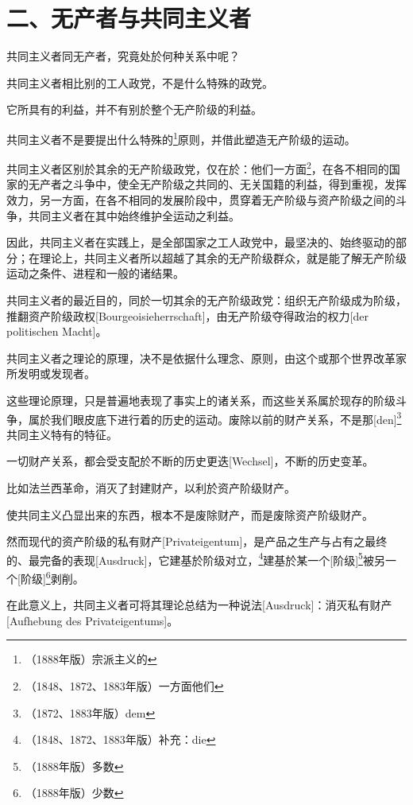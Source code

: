 \documentclass[a4paper,12pt]{ctexart}
\begin{document}

\section{二、无产者与共同主义者}

共同主义者同无产者，究竟处於何种关系中呢？

共同主义者相比别的工人政党，不是什么特殊的政党。

它所具有的利益，并不有别於整个无产阶级的利益。

共同主义者不是要提出什么特殊的\footnote{（1888年版）宗派主义的}原则，并借此塑造无产阶级的运动。

共同主义者区别於其余的无产阶级政党，仅在於：他们一方面\footnote{（1848、1872、1883年版）一方面他们}，在各不相同的国家的无产者之斗争中，使全无产阶级之共同的、无关国籍的利益，得到重视，发挥效力，另一方面，在各不相同的发展阶段中，贯穿着无产阶级与资产阶级之间的斗争，共同主义者在其中始终维护全运动之利益。

因此，共同主义者在实践上，是全部国家之工人政党中，最坚决的、始终驱动的部分；在理论上，共同主义者所以超越了其余的无产阶级群众，就是能了解无产阶级运动之条件、进程和一般的诸结果。

共同主义者的最近目的，同於一切其余的无产阶级政党：组织无产阶级成为阶级，推翻资产阶级政权[Bourgeoisieherrschaft]，由无产阶级夺得政治的权力[der politischen Macht]。

共同主义者之理论的原理，决不是依据什么理念、原则，由这个或那个世界改革家所发明或发现者。

这些理论原理，只是普遍地表现了事实上的诸关系，而这些关系属於现存的阶级斗争，属於我们眼皮底下进行着的历史的运动。废除以前的财产关系，不是那[den]\footnote{（1872、1883年版）dem}共同主义特有的特征。


一切财产关系，都会受支配於不断的历史更迭[Wechsel]，不断的历史变革。

比如法兰西革命，消灭了封建财产，以利於资产阶级财产。

使共同主义凸显出来的东西，根本不是废除财产，而是废除资产阶级财产。


然而现代的资产阶级的私有财产[Privateigentum]，是产品之生产与占有之最终的、最完备的表现[Ausdruck]，它建基於阶级对立，\footnote{（1848、1872、1883年版）补充：die}建基於某一个[阶级]\footnote{（1888年版）多数}被另一个[阶级]\footnote{（1888年版）少数}剥削。

在此意义上，共同主义者可将其理论总结为一种说法[Ausdruck]：消灭私有财产[Aufhebung des Privateigentums]。
\end{document}

